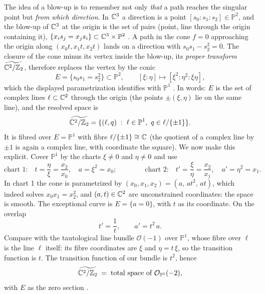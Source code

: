 The idea of a blow-up is to remember not only \emph{that} a path reaches the singular point
but \emph{from which direction}. In $\mathbb{C}^3$ a direction is a point $[s_0:s_1:s_2]\in
\mathbb{P}^2$, and the blow-up of $\mathbb{C}^3$ at the origin is the set of pairs (point, line
through the origin containing it), $\{x_is_j=x_js_i\}\subset\mathbb{C}^3\times\mathbb{P}^2$
. A path in the cone $f=0$ approaching the origin along
$(x_0t,x_1t,x_2t)$ lands on a direction with $s_0s_1-s_2^2=0$. The closure of the cone minus
its vertex inside the blow-up, its \emph{proper transform} $\widetilde{\mathbb{C}^2/\mathbb{Z}_2}$, therefore
replaces the vertex by the conic
\begin{equation}\label{eq:kummer:E}
  E=\{s_0s_1=s_2^2\}\subset\mathbb{P}^2,\qquad
  [\xi:\eta]\longmapsto[\xi^2:\eta^2:\xi\eta],
\end{equation}
which the displayed parametrization identifies with $\mathbb{P}^1$
. In words: $E$ is the set of complex lines $\ell\subset\mathbb{C}^2$
through the origin (the points $\pm(\xi,\eta)$ lie on the same line), and the resolved space
is
\begin{equation}\label{eq:kummer:total}
  \widetilde{\C^2/\Z_2}=\{(\ell,q)\;:\;\ell\in\mathbb{P}^1,\ q\in\ell/\{\pm1\}\} .
\end{equation}
It is fibred over $E=\mathbb{P}^1$ with fibre $\ell/\{\pm1\}\cong\mathbb{C}$ (the quotient of a
complex line by $\pm1$ is again a complex line, with coordinate the square). We now make this
explicit. Cover $\mathbb{P}^1$ by the charts $\xi\neq0$ and $\eta\neq0$ and use
\begin{equation}\label{eq:kummer:charts}
  \text{chart 1:}\quad t=\frac{\eta}{\xi}=\frac{x_2}{x_0},\quad a=\xi^2=x_0;
  \qquad\qquad
  \text{chart 2:}\quad t'=\frac{\xi}{\eta}=\frac{x_2}{x_1},\quad a'=\eta^2=x_1 .
\end{equation}
In chart 1 the cone is parametrized by $(x_0,x_1,x_2)=(a,\,at^2,\,at)$, which indeed solves
$x_0x_1=x_2^2$, and $(a,t)\in\mathbb{C}^2$ are unconstrained coordinates: the space is smooth. The
exceptional curve is $E=\{a=0\}$, with $t$ as its coordinate. On the overlap
\begin{equation}\label{eq:kummer:transition}
  t'=\frac1t,\qquad a'=t^2\,a .
\end{equation}
Compare with the tautological line bundle $\mathcal{O}(-1)$ over $\mathbb{P}^1$, whose fibre
over $\ell$ is the line $\ell$ itself: its fibre coordinates are $\xi$ and $\eta=t\,\xi$, so
the transition function is $t$. The transition function of our bundle is $t^2$, hence
\begin{equation}\label{eq:kummer:Ominus2}
  \widetilde{\mathbb{C}^2/\mathbb{Z}_2}\;=\;\text{total space of }\mathcal{O}_{\mathbb{P}^1}(-2),
\end{equation}
with $E$ as the zero section .

